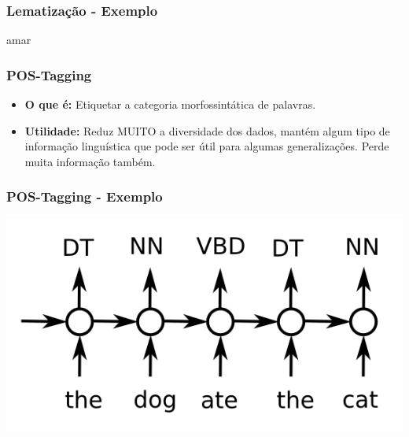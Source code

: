 \documentclass[11pt]{beamer}
\begin{document}
\begin{frame}
\frametitle{Lematização - Exemplo}
\begin{center}
	\large amar
\end{center}
\end{frame}


\begin{frame}
\frametitle{POS-Tagging}
\begin{itemize}
	\item \textbf{O que é:} Etiquetar a categoria morfossintática de palavras.\\
	\item \textbf{Utilidade:} Reduz MUITO a diversidade dos dados, mantém algum tipo de informação linguística que pode ser útil para algumas generalizações. Perde muita informação também.\\
\end{itemize}
\end{frame}


\begin{frame}
\frametitle{POS-Tagging - Exemplo}
\includegraphics[width=\columnwidth,height=\textheight,keepaspectratio]{pos_tag.png}
\end{frame}
\end{document}
